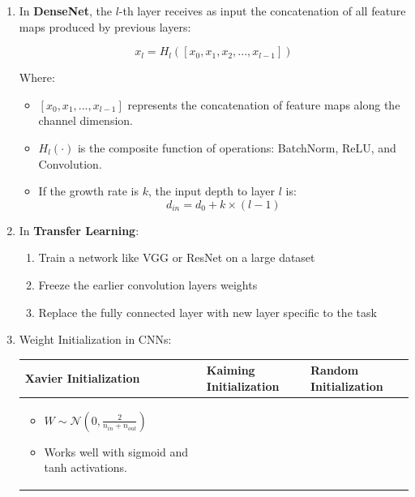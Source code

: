 \documentclass[12pt]{article}
\begin{document}
\begin{enumerate}
\begin{table}[h!]
\begin{tabular}{>{\raggedright}p{4cm}| >{\raggedright}p{4cm}| >{\raggedright}p{4cm}| >{\raggedright\arraybackslash}p{4cm}}
    \bottomrule
    \end{tabular}
    \caption{Comparison of Different Deep Learning Architectures}
    \end{table}

    \item In \textbf{DenseNet}, the $l$-th layer receives as input the concatenation of all feature maps produced by previous layers:

    \[
    x_l = H_l([x_0, x_1, x_2, ..., x_{l-1}])
    \]
    
    Where:
    \begin{itemize}
        \item $[x_0, x_1, ..., x_{l-1}]$ represents the concatenation of feature maps along the channel dimension.
        \item $H_l(\cdot)$ is the composite function of operations: BatchNorm, ReLU, and Convolution.
        \item If the growth rate is $k$, the input depth to layer $l$ is:
        \[
        d_{in} = d_0 + k \times (l - 1)
        \]
    \end{itemize}

    \item In \textbf{Transfer Learning}:
    \begin{enumerate}
        \item Train a network like VGG or ResNet on a large dataset
        \item Freeze the earlier convolution layers weights
        \item Replace the fully connected layer with new layer specific to the task
    \end{enumerate}

    \item Weight Initialization in CNNs:
    \begin{table}[h!]
        \centering
        \scriptsize
        \begin{tabular}{>{\raggedright}p{4cm}| >{\raggedright}p{4cm}| >{\raggedright\arraybackslash}p{4cm}}
        \toprule
        \textbf{Xavier Initialization}
        & 
        \textbf{Kaiming Initialization} 
        & 
        \textbf{Random Initialization} \\
        \midrule
        
        \begin{itemize}
            \item $W \sim \mathcal{N} \left( 0, \frac{2}{n_{in} + n_{out}} \right)$
            \item Works well with sigmoid and tanh activations.
        \end{itemize}
        

\end{tabular}
\end{table}
\end{enumerate}
\end{document}
